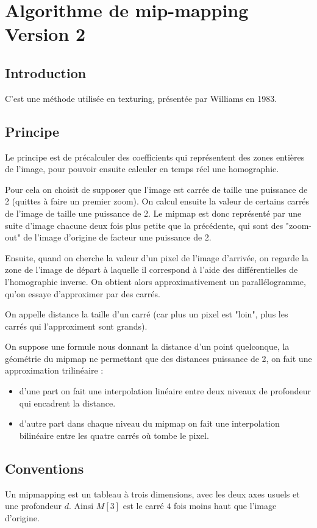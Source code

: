 \documentclass{article}
\newcommand{\se}[1]{\medbreak \medbreak \section*{#1}}
\newcommand{\sse}[1]{\medbreak \subsection*{#1}}
\begin{document}
\se{Algorithme de mip-mapping Version 2}

\sse{Introduction}

C'est une méthode utilisée en texturing, présentée par Williams en 1983.

\sse{Principe}

Le principe est de précalculer des coefficients qui représentent des zones entières de l'image, pour pouvoir ensuite calculer en temps réel une homographie. 

Pour cela on choisit de supposer que l'image est carrée de taille une puissance de 2 (quittes à faire un premier zoom). On calcul ensuite la valeur de certains carrés de l'image de taille une puissance de 2.
Le mipmap est donc représenté par une suite d'image chacune deux fois plus petite que la précédente, qui sont des "zoom-out" de l'image d'origine de facteur une puissance de 2.


Ensuite, quand on cherche la valeur d'un pixel de l'image d'arrivée, on regarde la zone de l'image de départ à laquelle il correspond à l'aide des différentielles de l'homographie inverse. On obtient alors approximativement un parallélogramme, qu'on essaye d'approximer par des carrés.


On appelle distance la taille d'un carré (car plus un pixel est "loin", plus les carrés qui l'approximent sont grands). 

On suppose une formule nous donnant la distance d'un point quelconque, la géométrie du mipmap ne permettant que des distances puissance de 2, on fait une approximation trilinéaire : 

\begin{itemize}
\item d'une part on fait une interpolation linéaire entre deux niveaux de profondeur qui encadrent la distance.
\item d'autre part dans chaque niveau du mipmap on fait une interpolation bilinéaire entre les quatre carrés où tombe le pixel.
\end{itemize}


\sse{Conventions}

Un mipmapping est un tableau à trois dimensions, avec les deux axes usuels et une profondeur $d$.
Ainsi $M[3]$ est le carré $4$ fois moins haut que l'image d'origine. 
\end{document}
